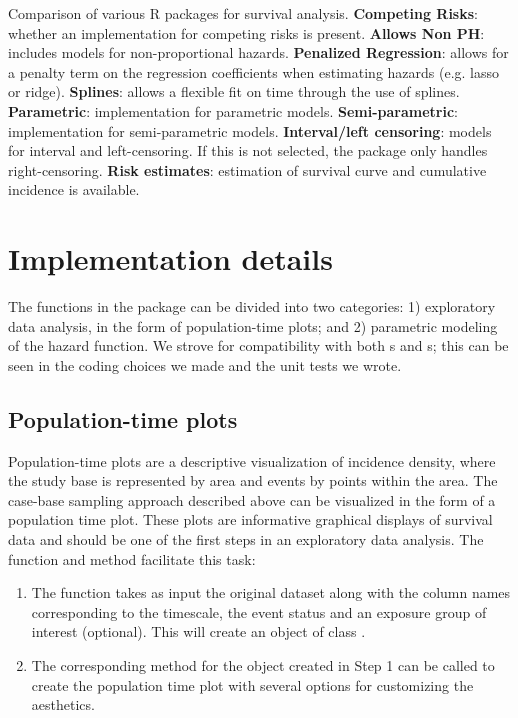 \begin{table}[ht]
{}
\caption{Comparison of various R packages for survival analysis. \textbf{Competing Risks}: whether an implementation for competing risks is present. \textbf{Allows Non PH}: includes models for non-proportional hazards. \textbf{Penalized Regression}: allows for a penalty term on the regression coefficients when estimating hazards (e.g. lasso or ridge). \textbf{Splines}: allows a flexible fit on time through the use of splines. \textbf{Parametric}: implementation for parametric models. \textbf{Semi-parametric}: implementation for semi-parametric models. \textbf{Interval/left censoring}: models for interval and left-censoring. If this is not selected, the package only handles right-censoring. \textbf{Risk estimates}: estimation of survival curve and cumulative incidence is available.}
\label{tab:surv-pkgs}
\end{table}

\hypertarget{implementation-details}{%
\section{Implementation details}\label{implementation-details}}

The functions in the  package can be divided into two
categories: 1) exploratory data analysis, in the form of population-time
plots; and 2) parametric modeling of the hazard function. We strove for
compatibility with both s and s; this
can be seen in the coding choices we made and the unit tests we wrote.

\hypertarget{population-time-plots}{%
\subsection{Population-time plots}\label{population-time-plots}}

Population-time plots are a descriptive visualization of incidence
density, where the study base is represented by area and events by
points within the area. The case-base sampling approach described above
can be visualized in the form of a population time plot. These plots are
informative graphical displays of survival data and should be one of the
first steps in an exploratory data analysis. The  function
and  method facilitate this task:

\begin{enumerate}
\def\labelenumi{\arabic{enumi}.}
\tightlist
\item
  The  function takes as input the original
  dataset along with the column names corresponding to the timescale,
  the event status and an exposure group of interest (optional). This
  will create an object of class .\\
\item
  The corresponding  method for the object created in Step 1
  can be called to create the population time plot with several options
  for customizing the aesthetics.
\end{enumerate}

